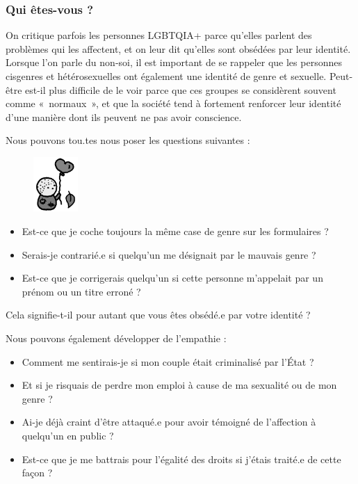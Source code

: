 \documentclass[12pt,openany]{book}
\begin{document}
\subsubsection*{Qui êtes-vous ?}

\noindent On critique parfois les personnes \mbox{LGBTQIA+} parce qu’elles parlent des problèmes qui les affectent, et on leur dit qu’elles sont obsédées par leur identité. Lorsque l’on parle du non-soi, il est important de se rappeler que les personnes cisgenres et hétérosexuelles ont également une identité de genre et sexuelle. Peut-être est-il plus difficile de le voir parce que ces groupes se considèrent souvent comme \mbox{« normaux »}, et que la société tend à fortement renforcer leur identité d’une manière dont ils peuvent ne pas avoir conscience.

Nous pouvons tou.tes nous poser les questions suivantes :
\begin{figure}
    \centering
    \includegraphics[width=0.15\textwidth]{33bw.png}
\end{figure}
\begin{itemize}[label=\textbullet, leftmargin=*]
\setlength\itemsep{-0.3em}
\item Est-ce que je coche toujours la même case de genre sur les formulaires ?
\item Serais-je contrarié.e si quelqu’un me désignait par le mauvais genre ?
\item Est-ce que je corrigerais quelqu’un si cette personne m’appelait par un prénom ou un titre erroné ?
\end{itemize}

Cela signifie-t-il pour autant que vous êtes obsédé.e par votre identité ?

Nous pouvons également développer de l’empathie :

\begin{itemize}[label=\textbullet, leftmargin=*]
\setlength\itemsep{-0.3em}
\item Comment me sentirais-je si mon couple était criminalisé par l’État ?
\item Et si je risquais de perdre mon emploi à cause de ma sexualité ou de mon genre ?
\item Ai-je déjà craint d’être attaqué.e pour avoir témoigné de l’affection à quelqu’un en public ?
\item Est-ce que je me battrais pour l’égalité des droits si j’étais traité.e de cette façon ?
\end{itemize}
\end{document}
